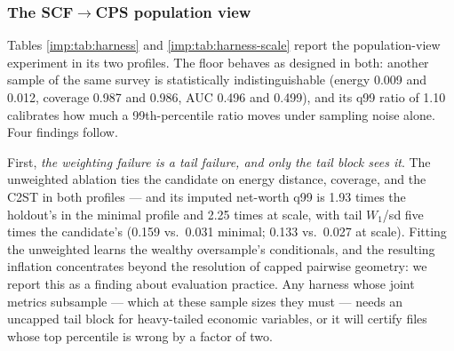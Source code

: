 \subsubsection{The SCF\texorpdfstring{$\to$}{->}CPS population view}
\label{imp:sec:results-harness}

\begin{table}[t]
\centering
\footnotesize
\resizebox{\textwidth}{!}{}
\caption{The population-view experiment, \emph{minimal} profile (six shared
predictors, two targets, ASEC 2025 receiver): candidates assembled from real
\cps{} demographics plus each method's imputed wealth, under \cps{}
household weights, scored against the held-out \scf{} through the \scf{}
view. The first row is the sampling-noise floor. Energy distance lower is
better; coverage higher; C2ST AUC of 0.5 is indistinguishable; net-worth
$W_1$/sd lower is better; a q99 ratio of 1 is a perfect extreme tail.}
\label{imp:tab:harness}
\end{table}

\begin{table}[t]
\centering
\footnotesize
\resizebox{\textwidth}{!}{}
\caption{The population-view experiment, \emph{\populace{}-scale} profile (ten
shared predictors, four chain-ordered balance-sheet targets, pooled ASEC
2023--2025 receiver). Columns as in Table~\ref{imp:tab:harness}.}
\label{imp:tab:harness-scale}
\end{table}

Tables \ref{imp:tab:harness} and \ref{imp:tab:harness-scale} report the
population-view experiment in its two profiles. The floor behaves as designed
in both: another sample of the same survey is statistically indistinguishable
(energy 0.009 and 0.012, coverage 0.987 and 0.986, AUC 0.496 and 0.499), and
its q99 ratio of 1.10 calibrates how much a 99th-percentile ratio moves under
sampling noise alone. Four findings follow.

First, \emph{the weighting failure is a tail failure, and only the tail
block sees it}. The unweighted ablation ties the candidate on energy
distance, coverage, and the C2ST in both profiles --- and its imputed
net-worth q99 is 1.93 times the holdout's in the minimal profile and 2.25
times at \populace{} scale, with tail $W_1$/sd five times the candidate's (0.159
vs.\ 0.031 minimal; 0.133 vs.\ 0.027 at scale). Fitting the \scf{}
unweighted learns the wealthy oversample's conditionals, and the resulting
inflation concentrates beyond the resolution of capped pairwise geometry: we
report this as a finding about evaluation practice. Any harness whose joint
metrics subsample --- which at these sample sizes they must --- needs an
uncapped tail block for heavy-tailed economic variables, or it will certify
files whose top percentile is wrong by a factor of two.

